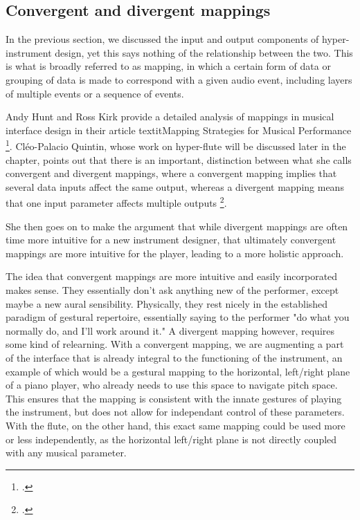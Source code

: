 \documentclass[12pt,twoside,maitrise]{dms_ks}
\theoremstyle{definition}
\begin{document}
{\subsection{Convergent and divergent mappings}

In the previous section, we discussed the input and output components of hyper-instrument design, yet this says nothing of the relationship between the two.
This is what is broadly referred to as mapping, in which a certain form of data or grouping of data is made to correspond with a given audio event, including layers of multiple events or a sequence of events. 

Andy Hunt and Ross Kirk provide a detailed analysis of mappings in musical interface design in their article textit{Mapping Strategies for Musical Performance} \footcite{hunt_mapping_2000}.
Cléo-Palacio Quintin, whose work on hyper-flute will be discussed later in the chapter, points out that there is an important, distinction between what she calls convergent and divergent mappings, where a convergent mapping implies that several data inputs affect the same output, whereas a divergent mapping means that one input parameter affects multiple outputs \footcite[44--45]{palacio-quintin_composition_2012-1}. 

She then goes on to make the argument that while divergent mappings are often time more intuitive for a new instrument designer, that ultimately convergent mappings are more intuitive for the player, leading to a more holistic approach. 


The idea that convergent mappings are more intuitive and easily incorporated makes sense. 
They essentially don't ask anything new of the performer, except maybe a new aural sensibility. 
Physically, they rest nicely in the established paradigm of gestural repertoire, essentially saying to the performer "do what you normally do, and I'll work around it." A divergent mapping however, requires some kind of relearning. 
With a convergent mapping, we are augmenting a part of the interface that is already integral to the functioning of the instrument, an example of which would be a gestural mapping to the horizontal, left/right plane of a piano player, who already needs to use this space to navigate pitch space.
This ensures that the mapping is consistent with the innate gestures of playing the instrument, but does not allow for independant control of these parameters.
With the flute, on the other hand, this exact same mapping could be used more or less independently, as the horizontal left/right plane is not directly coupled with any musical parameter.

}
\end{document}
